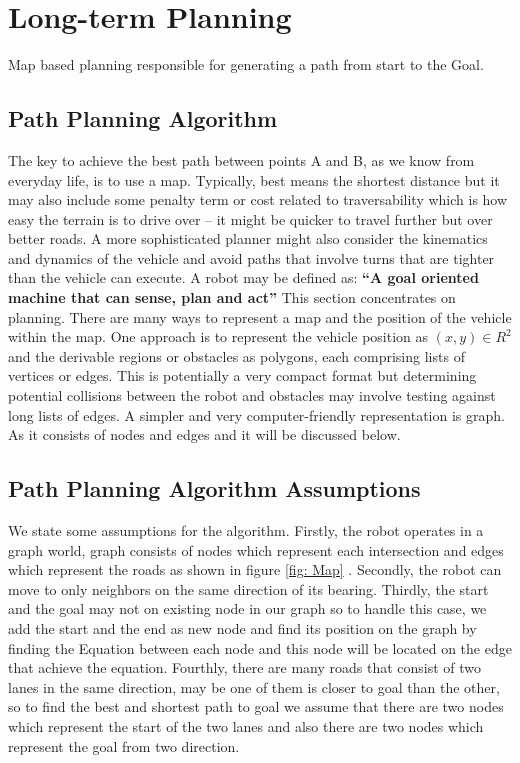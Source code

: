 \section{Long-term Planning}
\hspace{2cm}Map based planning responsible for generating a path from start to the Goal.

\subsection{Path Planning Algorithm}
\hspace{2cm}The key to achieve the best path between points A and B, as we know from everyday life, is to use a map. Typically, best means the shortest distance but it may also include some penalty term or cost related to traversability which is how easy the terrain is to drive over – it might be quicker to travel further but over better roads. A more sophisticated planner might also consider the kinematics and dynamics of the vehicle and avoid paths that involve turns that are tighter than the vehicle can execute. A robot may be defined as: \textbf{“A goal oriented machine that can sense, plan and act”} This section concentrates on planning.
There are many ways to represent a map and the position of the vehicle within the map. One approach is to represent the vehicle position as $(x, y) \in R^2$ and the derivable regions or obstacles as polygons, each comprising lists of vertices or edges. This is potentially a very compact format but determining potential collisions between the robot and obstacles may involve testing against long lists of edges. A simpler and very computer-friendly representation is graph. As it consists of nodes and edges and it will be discussed below.

\subsection{Path Planning Algorithm Assumptions}
\hspace{2cm}We state some assumptions for the algorithm.
Firstly, the robot operates in a graph world, graph consists of nodes which represent each intersection and edges which represent the roads as shown in figure  \ref{fig: Map} . 
Secondly, the robot can move to only neighbors on the same direction of its bearing. 
Thirdly, the start and the goal may not on existing node in our graph so to handle this case, we add the start and the end as new node and find its position on the graph by finding the Equation between each node and this node will be located on the edge that achieve the equation.
Fourthly, there are many roads that consist of two lanes in the same direction, may be one of them is closer to goal than the other, so to find the best and shortest path to goal we assume that there are two nodes which represent the start of the two lanes and also there are two nodes which represent the goal from two direction.

